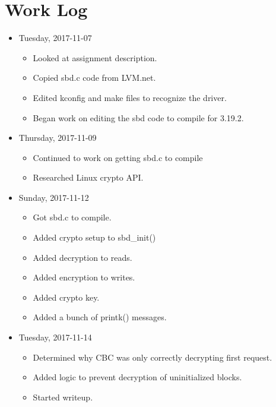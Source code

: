 \documentclass[letterpaper,10pt,titlepage,draftclsnofoot,onecolumn]{article}
\begin{document}
\section{Work Log}

\begin{itemize}
    \item Tuesday, 2017-11-07
    
        \begin{itemize}
            \item Looked at assignment description.
			\item Copied sbd.c code from LVM.net.
			\item Edited kconfig and make files to recognize the driver.
			\item Began work on editing the sbd code to compile for 3.19.2.
        \end{itemize}
    
    \item Thursday, 2017-11-09
    
        \begin{itemize}
            \item Continued to work on getting sbd.c to compile
            \item Researched Linux crypto API.
        \end{itemize}
        
    \item Sunday, 2017-11-12
    
        \begin{itemize}
            \item Got sbd.c to compile.
			\item Added crypto setup to sbd\_init()
			\item Added decryption to reads.
			\item Added encryption to writes.
			\item Added crypto key.
			\item Added a bunch of printk() messages.
        \end{itemize}
        
    \item Tuesday, 2017-11-14
    
        \begin{itemize}
            \item Determined why CBC was only correctly decrypting first request.
			\item Added logic to prevent decryption of uninitialized blocks.
			\item Started writeup.
        \end{itemize}
		

\end{itemize}
\end{document}
